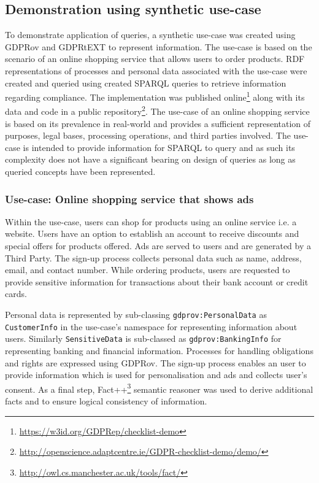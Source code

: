 \subsection{Demonstration using synthetic use-case} \label{sec:testing:sparql:demo}
To demonstrate application of queries, a synthetic use-case was created using GDPRov and GDPRtEXT to represent information.
The use-case is based on the scenario of an online shopping service that allows users to order products.
RDF representations of processes and personal data associated with the use-case were created and queried using created SPARQL queries to retrieve information regarding compliance.
The implementation was published online\footnote{\url{https://w3id.org/GDPRep/checklist-demo}} along with its data and code in a public repository\footnote{\url{http://openscience.adaptcentre.ie/GDPR-checklist-demo/demo/}}.
The use-case of an online shopping service is based on its prevalence in real-world and provides a sufficient representation of purposes, legal bases, processing operations, and third parties involved.
The use-case is intended to provide information for SPARQL to query and as such its complexity does not have a significant bearing on design of queries as long as queried concepts have been represented.

\subsubsection{Use-case: Online shopping service that shows ads}
Within the use-case, users can shop for products using an online service i.e. a website. Users have an option to establish an account to receive discounts and special offers for products offered.
Ads are served to users and are generated by a Third Party.
The sign-up process collects personal data such as name, address, email, and contact number.
While ordering products, users are requested to provide sensitive information for transactions about their bank account or credit cards.

Personal data is represented by sub-classing \texttt{gdprov:PersonalData} as \texttt{CustomerInfo} in the use-case's namespace for representing information about users.
Similarly \texttt{SensitiveData} is sub-classed as \texttt{gdprov:BankingInfo} for representing banking and financial information.
Processes for handling obligations and rights are expressed using GDPRov.
The sign-up process enables an user to provide information which is used for personalisation and ads and collects user's consent.
As a final step, Fact++\footnote{\url{http://owl.cs.manchester.ac.uk/tools/fact/}}
semantic reasoner was used to derive additional facts and to ensure logical consistency of information.

